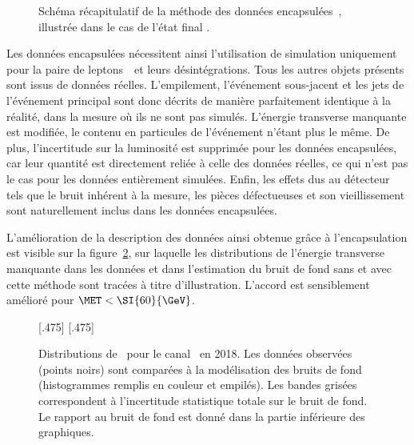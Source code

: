 \begin{figure}[h]
\caption[Schéma récapitulatif de la méthode des données encapsulées.]{Schéma récapitulatif de la méthode des données encapsulées~\cite{embedding}, illustrée dans le cas de l'état final \mu\tauh.}
\label{fig-embedding_recap}
\end{figure}
\par
Les données encapsulées nécessitent ainsi l'utilisation de simulation uniquement pour la paire de leptons~\tau\ et leurs désintégrations.
Tous les autres objets présents sont issus de données réelles.
L'empilement, l'événement sous-jacent et les jets de l'événement principal sont donc décrits de manière parfaitement identique à la réalité, dans la mesure où ils ne sont pas simulés.
L'énergie transverse manquante est modifiée, le contenu en particules de l'événement n'étant plus le même.
De plus, l'incertitude sur la luminosité est supprimée pour les données encapsulées, car leur quantité est directement reliée à celle des données réelles, ce qui n'est pas le cas pour les données entièrement simulées.
Enfin, les effets dus au détecteur tels que le bruit inhérent à la mesure, les pièces défectueuses et son vieillissement sont naturellement inclus dans les données encapsulées.
\par
L'amélioration de la description des données ainsi obtenue grâce à l'encapsulation est visible sur la figure~\ref{fig-embedding_2018mt_puppimet_illustration}, sur laquelle les distributions de l'énergie transverse manquante dans les données et dans l'estimation du bruit de fond sans et avec cette méthode sont tracées à titre d'illustration.
L'accord est sensiblement amélioré pour $\MET < \SI{60}{\GeV}$.
\begin{figure}[h]
\centering

[.475\textwidth]
{}
\hfill
{}[.475\textwidth]
{}

\caption[Distributions de \MET\ pour le canal \mu\tauh\ en 2018.]{Distributions de \MET\ pour le canal \mu\tauh\ en 2018. Les données observées (points noirs) sont comparées à la modélisation des bruits de fond (histogrammes remplis en couleur et empilés). Les bandes grisées correspondent à l'incertitude statistique totale sur le bruit de fond. Le rapport au bruit de fond est donné dans la partie inférieure des graphiques.}
\label{fig-embedding_2018mt_puppimet_illustration}
\end{figure}
